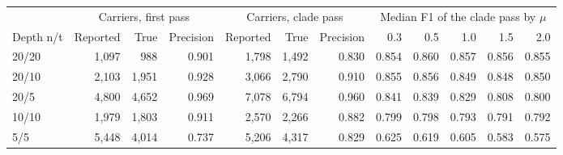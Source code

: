 \begin{tabular}{lrrrrrrrrrrr}
\toprule
 & \multicolumn{3}{c}{Carriers, first pass} & \multicolumn{3}{c}{Carriers, clade pass} & \multicolumn{5}{c}{Median F1 of the clade pass by $\mu$} \\
\cmidrule(lr){2-4}\cmidrule(lr){5-7}\cmidrule(lr){8-12}
Depth n/t & Reported & True & Precision & Reported & True & Precision & 0.3 & 0.5 & 1.0 & 1.5 & 2.0 \\
\midrule
20/20 & 1,097 & 988 & 0.901 & 1,798 & 1,492 & 0.830 & 0.854 & 0.860 & 0.857 & 0.856 & 0.855 \\
20/10 & 2,103 & 1,951 & 0.928 & 3,066 & 2,790 & 0.910 & 0.855 & 0.856 & 0.849 & 0.848 & 0.850 \\
20/5 & 4,800 & 4,652 & 0.969 & 7,078 & 6,794 & 0.960 & 0.841 & 0.839 & 0.829 & 0.808 & 0.800 \\
10/10 & 1,979 & 1,803 & 0.911 & 2,570 & 2,266 & 0.882 & 0.799 & 0.798 & 0.793 & 0.791 & 0.792 \\
5/5 & 5,448 & 4,014 & 0.737 & 5,206 & 4,317 & 0.829 & 0.625 & 0.619 & 0.605 & 0.583 & 0.575 \\
\bottomrule
\end{tabular}
